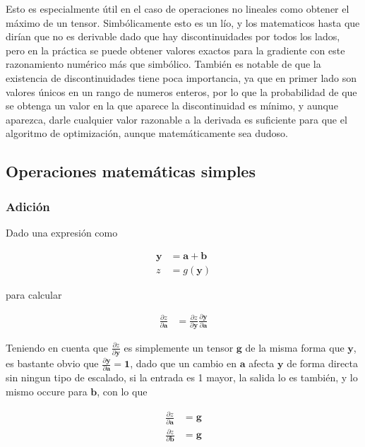 \documentclass{article}
\begin{document}
Esto es especialmente útil en el caso de operaciones no lineales como obtener el máximo de un tensor.
Simbólicamente esto es un lío, y los matematicos hasta que dirían que no es derivable dado que hay discontinuidades por todos los lados,
pero en la práctica se puede obtener valores exactos para la gradiente con este razonamiento numérico más que simbólico.
También es notable de que la existencia de discontinuidades tiene poca importancia, ya que en primer lado son valores únicos
en un rango de numeros enteros, por lo que la probabilidad de que se obtenga un valor en la que aparece la discontinuidad es
mínimo, y aunque aparezca, darle cualquier valor razonable a la derivada es suficiente para que el algoritmo de optimización,
aunque matemáticamente sea dudoso.

\subsection{Operaciones matemáticas simples}

\subsubsection*{Adición}

Dado una expresión como

\begin{align*}
	\bm{y} &= \bm{a} + \bm{b} \\
	z &= g(\bm{y})
\end{align*}

para calcular

\begin{align*}
	\frac{\partial z}{\partial \bm{a}} &= \frac{\partial z}{\partial \bm{y}} \frac{\partial \bm{y}}{\partial \bm{a}}
\end{align*}

Teniendo en cuenta que $\frac{\partial z}{\partial \bm{y}}$ es simplemente un tensor $\bm{g}$ de la misma forma que $\bm{y}$,
es bastante obvio que $\frac{\partial \bm{y}}{\partial \bm{a}} = \bm{1}$, dado que un cambio en $\bm{a}$ afecta $\bm{y}$ de forma directa
sin ningun tipo de escalado, si la entrada es 1 mayor, la salida lo es también, y lo mismo occure para $\bm{b}$, con lo que

\begin{align*}
	\frac{\partial z}{\partial \bm{a}} &= \bm{g} \\
	\frac{\partial z}{\partial \bm{b}} &= \bm{g}
\end{align*}
\end{document}
